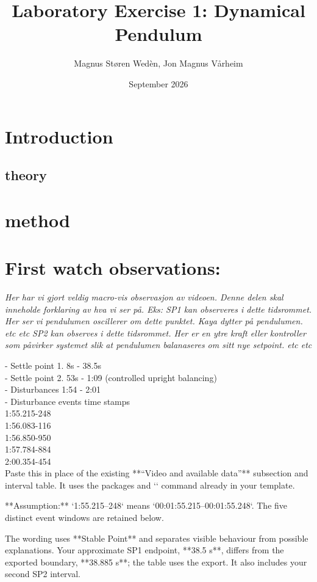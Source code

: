 \documentclass{article}
\title{Laboratory Exercise 1: Dynamical Pendulum}
\author{Magnus Støren Wedèn, Jon Magnus Vårheim}
\date{September 2026}
\newcommand{\manual}[1]{\texttt{#1}}
\begin{document}
\maketitle

\section{Introduction}
\subsection{theory}


\section{method}


\section{First watch observations:}
\textit{Her har vi gjort veldig macro-vis observasjon av videoen. Denne delen skal inneholde forklaring av hva vi ser på.
Eks:
SP1 kan observeres i dette tidsrommet. Her ser vi pendulumen oscillerer om dette punktet. Kaya dytter på pendulumen. etc etc
SP2 kan observes i dette tidsrommet. Her er en ytre kraft eller kontroller som påvirker systemet slik at pendulumen balanaseres om sitt nye setpoint. etc etc}

- Settle point 1. 8s - 38.5s\\
- Settle point 2. 53s - 1:09 (controlled upright balancing)\\
- Disturbances 1:54 - 2:01\\

- Disturbance events time stamps\\
1:55.215-248\\
1:56.083-116\\
1:56.850-950\\
1:57.784-884\\
2:00.354-454\\

Paste this in place of the existing **“Video and available data”** subsection and interval table. It uses the packages and `\manual{}` command already in your template.

**Assumption:** `1:55.215–248` means `00:01:55.215–00:01:55.248`. The five distinct event windows are retained below.

The wording uses **Stable Point** and separates visible behaviour from possible explanations. Your approximate SP1 endpoint, **38.5 s**, differs from the exported boundary, **38.885 s**; the table uses the export. It also includes your second SP2 interval.
\end{document}
